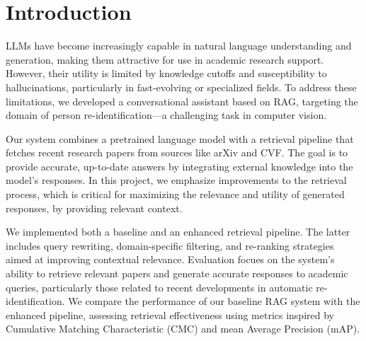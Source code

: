 \documentclass[fleqn,moreauthors,10pt]{ds_report}
\affiliation{\textit{Advisor: Aleš Žagar}}
\begin{document}
\flushbottom 

\maketitle 

\thispagestyle{empty} 


\section*{Introduction}
LLMs have become increasingly capable in natural language understanding and generation, making them attractive for use in academic research support. However, their utility is limited by knowledge cutoffs and susceptibility to hallucinations, particularly in fast-evolving or specialized fields. To address these limitations, we developed a conversational assistant based on RAG, targeting the domain of person re-identification—a challenging task in computer vision.

Our system combines a pretrained language model with a retrieval pipeline that fetches recent research papers from sources like arXiv and CVF. The goal is to provide accurate, up-to-date answers by integrating external knowledge into the model's responses. In this project, we emphasize improvements to the retrieval process, which is critical for maximizing the relevance and utility of generated responses, by providing relevant context.

We implemented both a baseline and an enhanced retrieval pipeline. The latter includes query rewriting, domain-specific filtering, and re-ranking strategies aimed at improving contextual relevance. Evaluation focues on the system's ability to retrieve relevant papers and generate accurate responses to academic queries, particularly those related to recent developments in automatic re-identification. We compare the performance of our baseline RAG system with the enhanced pipeline, assessing retrieval effectiveness using metrics inspired by Cumulative Matching Characteristic (CMC) and mean Average Precision (mAP).




\end{document}
